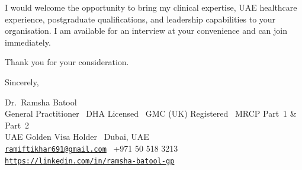 \documentclass[a4paper,11pt]{article}
\begin{document}
I would welcome the opportunity to bring my clinical expertise, UAE healthcare experience, postgraduate qualifications, and leadership capabilities to your organisation. I am available for an interview at your convenience and can join immediately.

Thank you for your consideration.

Sincerely,

Dr.\ Ramsha Batool\\
General Practitioner \textbar\ DHA Licensed \textbar\ GMC (UK) Registered \textbar\ MRCP Part~1 \& Part~2\\
UAE Golden Visa Holder \textbar\ Dubai, UAE\\
\texttt{\href{mailto:ramiftikhar691@gmail.com}{ramiftikhar691@gmail.com}} \textbar\ +971 50 518 3213\\
\texttt{\href{https://linkedin.com/in/ramsha-batool-gp}{https://linkedin.com/in/ramsha-batool-gp}}
\end{document}
